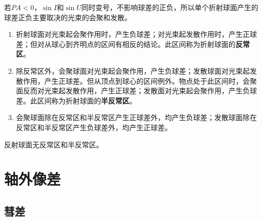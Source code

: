 \documentclass[cn,10pt,chinesefont=founder,math=newtx,cite=super,twoside]{elegantbook}
\begin{document}
\begin{table}[htbp]
	\small
	\centering
	\caption{$r<0$的球面在各区间内的球差正负}
	\label{tab:spherical-aberration-of-sphere-in-each-interval-2}
\end{table}




若$PA<0$，$\sin I$和$\sin U$同时变号，不影响球差的正负，所以单个折射球面产生的球差正负主要取决的光束的会聚和发散。

\begin{conclusion}
\begin{enumerate}
	\item 折射球面对光束起会聚作用时，产生负球差；对光束起发散作用时，产生正球差；但对从球心到齐明点的区间有相反的结论。此区间称为折射球面的\textbf{反常区}。
	\item 除反常区外，会聚球面对光束起会聚作用，产生负球差；发散球面对光束起发散作用，产生正球差。但从顶点到球心的区间例外。物点处于此区间时，会聚面反而对光束起发散作用，产生正球差；发散面对光束起会聚作用，产生负球差。此区间称为折射球面的\textbf{半反常区}。
	\item 会聚球面除在反常区和半反常区产生正球差外，均产生负球差；发散球面除在反常区和半反常区产生负球差外，均产生正球差。
\end{enumerate}
\end{conclusion}
\begin{note}
反射球面无反常区和半反常区。
\end{note}

\section{轴外像差}
\subsection{彗差}
\end{document}

